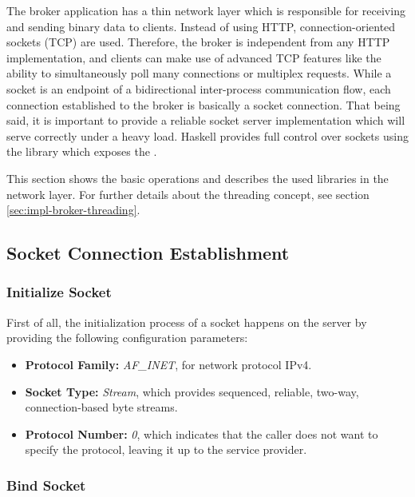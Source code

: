 The broker application has a thin network layer which is responsible for
receiving and sending binary data to clients. Instead of using HTTP,
connection-oriented sockets (TCP) are used. Therefore, the broker is independent
from any HTTP implementation, and clients can make use of advanced TCP features
like the ability to simultaneously poll many connections or multiplex requests.
While a socket is an endpoint of a bidirectional inter-process communication
flow, each connection established to the broker is basically a socket
connection. That being said, it is important to provide a reliable socket server
implementation which will serve correctly under a heavy load. Haskell provides
full control over sockets using the
library which exposes the .

This section shows the basic operations and describes the used libraries in the
network layer. For further details about the threading concept, see section
\ref{sec:impl-broker-threading}. 

\subsection{Socket Connection Establishment}
\label{sec:impl-broker-socket-connection}

\subsubsection{Initialize Socket}

First of all, the initialization process of a socket happens on the server by providing the following configuration parameters:

\begin{itemize}
    \item {\bf Protocol Family:} \textit{AF\_INET}, for network protocol IPv4.
    \item {\bf Socket Type:} \textit{Stream}, which provides sequenced, reliable, two-way, connection-based byte streams.
    \item {\bf Protocol Number:} \textit{0}, which indicates that the caller does not want to specify the protocol, leaving it up to the service provider.
\end{itemize}

\subsubsection{Bind Socket}

